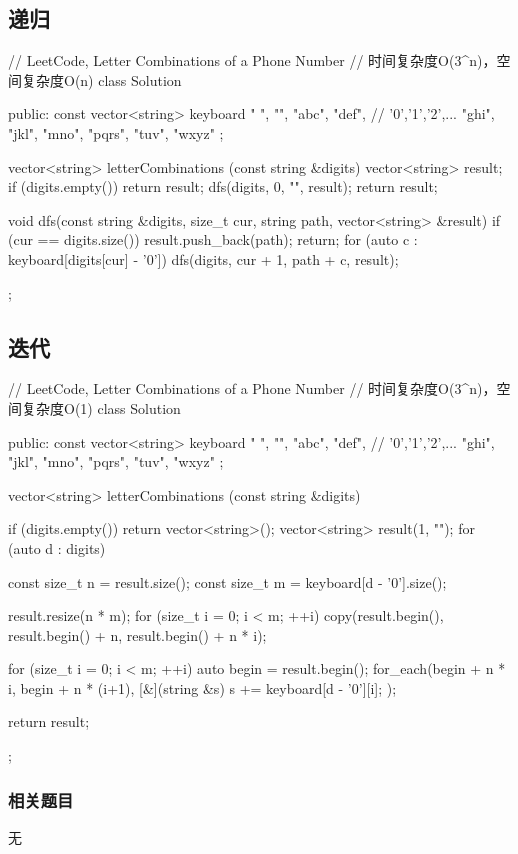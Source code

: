 \subsection{递归}
\begin{Code}
// LeetCode, Letter Combinations of a Phone Number
// 时间复杂度O(3^n)，空间复杂度O(n)
class Solution {
public:
    const vector<string> keyboard { " ", "", "abc", "def", // '0','1','2',...
            "ghi", "jkl", "mno", "pqrs", "tuv", "wxyz" };

    vector<string> letterCombinations (const string &digits) {
        vector<string> result;
        if (digits.empty()) return result;
        dfs(digits, 0, "", result);
        return result;
    }

    void dfs(const string &digits, size_t cur, string path,
            vector<string> &result) {
        if (cur == digits.size()) {
            result.push_back(path);
            return;
        }
        for (auto c : keyboard[digits[cur] - '0']) {
            dfs(digits, cur + 1, path + c, result);
        }
    }
};
\end{Code}


\subsection{迭代}
\begin{Code}
// LeetCode, Letter Combinations of a Phone Number
// 时间复杂度O(3^n)，空间复杂度O(1)
class Solution {
public:
    const vector<string> keyboard { " ", "", "abc", "def", // '0','1','2',...
            "ghi", "jkl", "mno", "pqrs", "tuv", "wxyz" };

    vector<string> letterCombinations (const string &digits) {
        if (digits.empty()) return vector<string>();
        vector<string> result(1, "");
        for (auto d : digits) {
            const size_t n = result.size();
            const size_t m = keyboard[d - '0'].size();

            result.resize(n * m);
            for (size_t i = 0; i < m; ++i)
                copy(result.begin(), result.begin() + n, result.begin() + n * i);

            for (size_t i = 0; i < m; ++i) {
                auto begin = result.begin();
                for_each(begin + n * i, begin + n * (i+1), [&](string &s) {
                    s += keyboard[d - '0'][i];
                });
            }
        }
        return result;
    }
};
\end{Code}


\subsubsection{相关题目}
\begindot
\item 无
\myenddot
